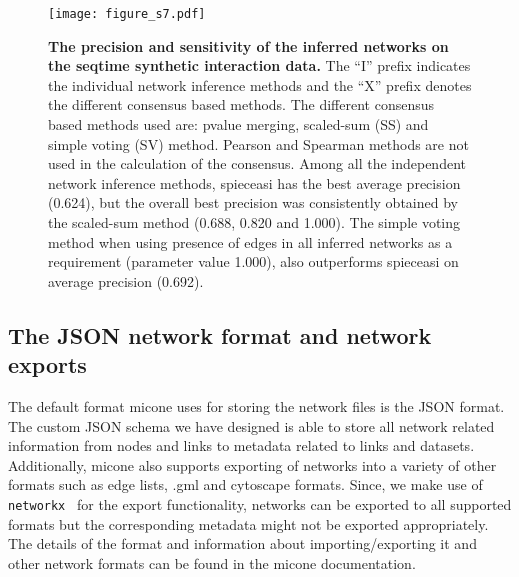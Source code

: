     \begin{figure}[H]
      \centering
      \texttt{[image: figure\_s7.pdf]}
    \end{figure}
    \begin{figure}[H]
      \centering
        \caption{
          \textbf{The precision and sensitivity of the inferred networks on the seqtime synthetic interaction data.}
          The ``I'' prefix indicates the individual network inference methods and the ``X'' prefix denotes the different consensus based methods.
          The different consensus based methods used are: pvalue merging, scaled-sum (SS) and simple voting (SV) method.
          Pearson and Spearman methods are not used in the calculation of the consensus.
          Among all the independent network inference methods, \ac{spieceasi} has the best average precision (0.624), but the overall best precision was consistently obtained by the scaled-sum method (0.688, 0.820 and 1.000).
          The simple voting method when using presence of edges in all inferred networks as a requirement (parameter value 1.000), also outperforms \ac{spieceasi} on average precision (0.692).
        }
      \label{fig:figure_s7}
    \end{figure}
    \FloatBarrier
    \newpage


  \subsection*{The JSON network format and network exports}

    The default format \ac{micone} uses for storing the network files is the JSON format.
    The custom JSON schema we have designed is able to store all network related information from nodes and links to metadata related to links and datasets.
    Additionally, \ac{micone} also supports exporting of networks into a variety of other formats such as edge lists, .gml and cytoscape formats.
    Since, we make use of \texttt{networkx}~\cite{hagbergExploringNetworkStructure2008} for the export functionality, networks can be exported to all supported formats but the corresponding metadata might not be exported appropriately.
    The details of the format and information about importing/exporting it and other network formats can be found in the \ac{micone} documentation.
